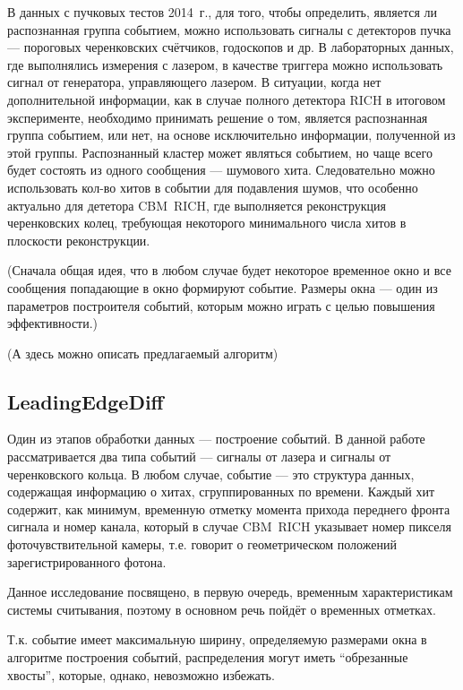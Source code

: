 В данных с пучковых тестов 2014~г., для того, чтобы определить, является ли распознанная группа событием, можно использовать сигналы с детекторов пучка --- пороговых черенковских счётчиков, годоскопов и др. В лабораторных данных, где выполнялись измерения с лазером, в качестве триггера можно использовать сигнал от генератора, управляющего лазером. В ситуации, когда нет дополнительной информации, как в случае полного детектора RICH в итоговом эксперименте, необходимо принимать решение о том, является распознанная группа событием, или нет, на основе исключительно информации, полученной из этой группы. Распознанный кластер может являться событием, но чаще всего будет состоять из одного сообщения --- шумового хита. Следовательно можно использовать кол-во хитов в событии для подавления шумов, что особенно актуально для дететора CBM~RICH, где выполняется реконструкция черенковских колец, требующая некоторого минимального числа хитов в плоскости реконструкции.

(Сначала общая идея, что в любом случае будет некоторое временное окно и все сообщения попадающие в окно формируют событие. Размеры окна --- один из параметров построителя событий, которым можно играть с целью повышения эффективности.)

(А здесь можно описать предлагаемый алгоритм)

\subsection{LeadingEdgeDiff}\label{sec:secLeadingEdgeDiff}

Один из этапов обработки данных --- построение событий. В данной работе рассматривается два типа событий --- сигналы от лазера и сигналы от черенковского кольца. В любом случае, событие --- это структура данных, содержащая информацию о хитах, сгруппированных по времени. Каждый хит содержит, как минимум, временную отметку момента прихода переднего фронта сигнала и номер канала, который в случае CBM~RICH указывает номер пикселя фоточувствительной камеры, т.е. говорит о геометрическом положений зарегистрированного фотона.

Данное исследование посвящено, в первую очередь, временным характеристикам системы считывания, поэтому в основном речь пойдёт о временных отметках.

Т.к. событие имеет максимальную ширину, определяемую размерами окна в алгоритме построения событий, распределения могут иметь ``обрезанные хвосты'', которые, однако, невозможно избежать.

